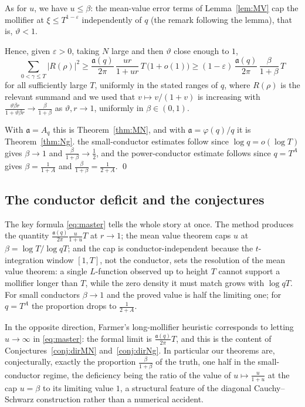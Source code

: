\documentclass[12pt,a4paper,reqno]{amsart}
\theoremstyle{remark}
\numberwithin{equation}{section}
\begin{document}
As for $u$, we have $u\le\beta$: the mean-value error terms of Lemma~\ref{lem:MV} cap the mollifier at $\xi\le T^{1-\varepsilon}$ independently of $q$ (the remark following the lemma), that is, $\vartheta<1$.

Hence, given $\varepsilon>0$, taking $N$ large and then $\vartheta$ close enough to $1$,
\[
\sum_{0<\gamma\le T}|R(\rho)|^2\ge\frac{\mathfrak a(q)}{2\pi}\,\frac{ur}{1+ur}\,T\,\bigl(1+o(1)\bigr)\ge(1-\varepsilon)\,\frac{\mathfrak a(q)}{2\pi}\,\frac{\beta}{1+\beta}\,T
\]
for all sufficiently large $T$, uniformly in the stated ranges of $q$, where $R(\rho)$ is the relevant summand and we used that $v\mapsto v/(1+v)$ is increasing with $\tfrac{\vartheta\beta r}{1+\vartheta\beta r}\to\tfrac{\beta}{1+\beta}$ as $\vartheta,r\to1$, uniformly in $\beta\in(0,1)$.

With $\mathfrak a=A_q$ this is Theorem~\ref{thm:MN}, and with $\mathfrak a=\varphi(q)/q$ it is Theorem~\ref{thm:Ng}. the small-conductor estimates follow since $\log q=o(\log T)$ gives $\beta\to1$ and $\tfrac{\beta}{1+\beta}\to\tfrac12$, and the power-conductor estimate follows since $q=T^{A}$ gives $\beta=\tfrac1{1+A}$ and $\tfrac{\beta}{1+\beta}=\tfrac{1}{2+A}$. \qed

\subsection{The conductor deficit and the conjectures}\label{subsect:deficit}
The key formula \eqref{eq:master} tells the whole story at once. The method produces the quantity $\tfrac{\mathfrak a(q)}{2\pi}\tfrac{u}{1+u}T$ at $r\to1$; the mean value theorem caps $u$ at $\beta=\log T/\log qT$; and the cap is conductor-independent because the $t$-integration window $[1,T]$, not the conductor, sets the resolution of the mean value theorem: a single $L$-function observed up to height $T$ cannot support a mollifier longer than $T$, while the zero density it must match grows with $\log qT$. For small conductors $\beta\to1$ and the proved value is half the limiting one; for $q=T^A$ the proportion drops to $\tfrac1{2+A}$.

In the opposite direction, Farmer's long-mollifier heuristic \cite{Farmer} corresponds to letting $u\to\infty$ in \eqref{eq:master}: the formal limit is $\tfrac{\mathfrak a(q)}{2\pi}T$, and this is the content of Conjectures~\ref{conj:dirMN} and~\ref{conj:dirNg}. In particular our theorems are, conjecturally, exactly the proportion $\tfrac{\beta}{1+\beta}$ of the truth, one half in the small-conductor regime, the deficiency being the ratio of the value of $u\mapsto\tfrac{u}{1+u}$ at the cap $u=\beta$ to its limiting value $1$, a structural feature of the diagonal Cauchy--Schwarz construction rather than a numerical accident.
\end{document}
